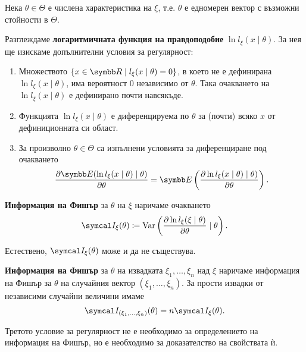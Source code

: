 \documentclass[
  numbers=endperiod,
  headings=standardclasses,
  bibliography=totocnumbered,
]{scrartcl}
\begin{document}
\begin{definition}\label{def:fisher_information}
  Нека \( \theta \in \Theta \) е числена характеристика на \( \xi \), т.е. \( \theta \) е едномерен вектор с възможни стойности в \( \Theta \).

  Разглеждаме \textbf{логаритмичната функция на правдоподобие} \( \ln l_\xi(x \mid \theta) \). За нея ще изискаме допълнителни условия за регулярност:
  \begin{enumerate}
    \item Множеството \( \{ x \in \R \mid l_\xi(x \mid \theta) = 0 \} \), в което не е дефинирана \( \ln l_\xi(x \mid \theta) \), има вероятност \( 0 \) независимо от \( \theta \). Така очакването на \( \ln l_\xi(x \mid \theta) \) е дефинирано почти навсякъде.
    \item Функцията \( \ln l_\xi(x \mid \theta) \) е диференцируема по \( \theta \) за (почти) всяко \( x \) от дефиниционната си област.
    \item За произволно \( \theta \in \Theta \) са изпълнени условията за диференциране под очакването
    \begin{equation*}
      \frac {\partial \Expect(\ln l_\xi(x \mid \theta) \mid \theta)} {\partial \theta}
      =
      \Expect\left( \frac {\partial \ln l_\xi(x \mid \theta) \mid \theta)} {\partial \theta} \right).
    \end{equation*}
  \end{enumerate}

  \textbf{Информация на Фишър} за \( \theta \) на \( \xi \) наричаме очакването
  \begin{equation*}
    \FisherInfo_\xi(\theta) \coloneqq \Var\left( \frac {\partial \ln l_\xi(\xi \mid \theta)} {\partial \theta} \mid \theta \right).
  \end{equation*}

  Естествено, \( \FisherInfo_\xi(\theta) \) може и да не съществува.

  \textbf{Информация на Фишър} за \( \theta \) на извадката \( \xi_1, \ldots, \xi_n \) над \( \xi \) наричаме информация на Фишър за \( \theta \) на случайния вектор \( (\xi_1, \ldots, \xi_n) \). За прости извадки от независими случайни величини имаме
  \begin{equation*}
    \FisherInfo_{(\xi_1, \ldots, \xi_n)}(\theta) = n \FisherInfo_\xi(\theta).
  \end{equation*}
\end{definition}

\begin{remark}
  Третото условие за регулярност не е необходимо за определението на информация на Фишър, но е необходимо за доказателство на свойствата ѝ.
\end{remark}
\end{document}
